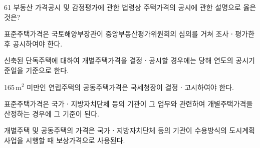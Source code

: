 \begin{question}{61}
부동산 가격공시 및 감정평가에 관한 법령상 주택가격의 공시에 관한 설명으로 옳은 것은?
\begin{choices}
  \item 표준주택가격은 국토해양부장관이 중앙부동산평가위원회의 심의를 거쳐 조사ㆍ평가한 후 공시하여야 한다.
  \item 신축된 단독주택에 대하여 개별주택가격을 결정ㆍ공시할 경우에는 당해 연도의 공시기준일을 기준으로 한다.
  \item 165\,m$^2$ 미만인 연립주택의 공동주택가격은 국세청장이 결정ㆍ고시하여야 한다.
  \item 표준주택가격은 국가ㆍ지방자치단체 등의 기관이 그 업무와 관련하여 개별주택가격을 산정하는 경우에 그 기준이 된다.
  \item 개별주택 및 공동주택의 가격은 국가ㆍ지방자치단체 등의 기관이 수용방식의 도시계획사업을 시행할 때 보상가격으로 사용된다.
\end{choices}
\end{question}
